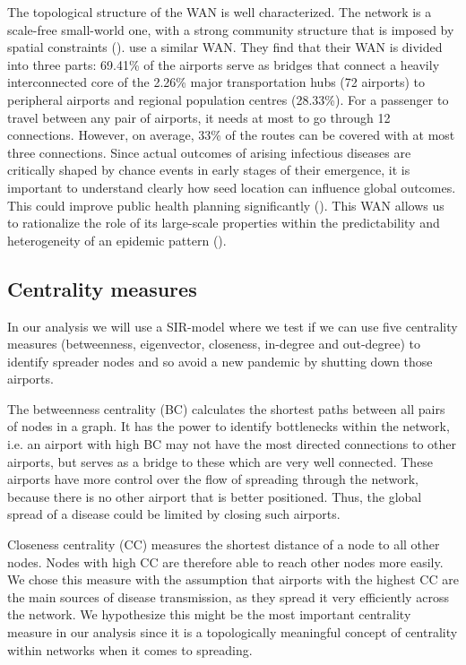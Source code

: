 \documentclass{Template_resources/netsci-project}
\begin{document}
The topological structure of the WAN is well characterized. The network is a scale-free small-world one, with a strong community structure that is imposed by spatial constraints (\cite{Lawyer2016, Barrat2005}). \cite{Verma2014} use a similar WAN. They find that their WAN is divided into three parts:
69.41\% of the airports serve as bridges that connect a heavily interconnected core of the 2.26\% major transportation hubs (72 airports) to peripheral airports and regional population centres (28.33\%). For a passenger to travel between any pair of airports, it needs at most to go through 12 connections. However, on average, 33\% of the routes can be covered with at most three connections.
Since actual outcomes of arising infectious diseases are critically shaped by chance events in early stages of their emergence, it is important to understand clearly how seed location can influence global outcomes. This could improve public health planning significantly (\cite{Lawyer2016}). 
This WAN allows us to rationalize the role of its large-scale properties within the predictability and heterogeneity of an epidemic pattern (\cite{Colizza2006TheMO}).

\subsection{Centrality measures}
In our analysis we will use a SIR-model where we test if we can use five centrality measures (betweenness, eigenvector, closeness, in-degree and out-degree) to identify spreader nodes and so avoid a new pandemic by shutting down those airports. 

The betweenness centrality (BC) calculates the shortest paths between all pairs of nodes in a graph. It has the power to identify bottlenecks within the network, i.e. an airport with high BC may not have the most directed connections to other airports, but serves as a bridge to these which are very well connected. These airports have more control over the flow of spreading through the network, because there is no other airport that is better positioned. Thus, the global spread of a disease could be limited by closing such airports.

Closeness centrality (CC) measures the shortest distance of a node to all other nodes. Nodes with high CC are therefore able to reach other nodes more easily. We chose this measure with the assumption that airports with the highest CC are the main sources of disease transmission, as they spread it very efficiently across the network. We hypothesize this might be the most important centrality measure in our analysis since it is a topologically meaningful concept of centrality within networks when it comes to spreading. 
\end{document}
